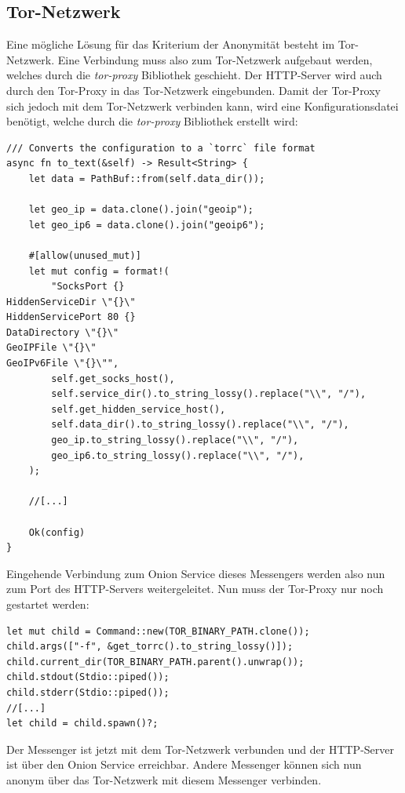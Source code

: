 \documentclass[a4paper,ngerman, headheight=28pt,12pt]{scrartcl}
\begin{document}
\subsection{Tor-Netzwerk}
Eine mögliche Lösung für das Kriterium der Anonymität besteht im Tor-Netzwerk. Eine Verbindung muss also zum Tor-Netzwerk aufgebaut werden, welches durch die \textit{tor-proxy} Bibliothek geschieht.
Der HTTP-Server wird auch durch den Tor-Proxy in das Tor-Netzwerk eingebunden. Damit der Tor-Proxy sich jedoch mit dem Tor-Netzwerk verbinden kann, wird eine Konfigurationsdatei benötigt, welche durch die \textit{tor-proxy} Bibliothek erstellt wird:
\begin{verbatim}
/// Converts the configuration to a `torrc` file format
async fn to_text(&self) -> Result<String> {
    let data = PathBuf::from(self.data_dir());

    let geo_ip = data.clone().join("geoip");
    let geo_ip6 = data.clone().join("geoip6");

    #[allow(unused_mut)]
    let mut config = format!(
        "SocksPort {}
HiddenServiceDir \"{}\"
HiddenServicePort 80 {}
DataDirectory \"{}\"
GeoIPFile \"{}\"
GeoIPv6File \"{}\"",
        self.get_socks_host(),
        self.service_dir().to_string_lossy().replace("\\", "/"),
        self.get_hidden_service_host(),
        self.data_dir().to_string_lossy().replace("\\", "/"),
        geo_ip.to_string_lossy().replace("\\", "/"),
        geo_ip6.to_string_lossy().replace("\\", "/"),
    );

    //[...]

    Ok(config)
}
\end{verbatim}
Eingehende Verbindung zum Onion Service dieses Messengers werden also nun zum Port des HTTP-Servers weitergeleitet. Nun muss der Tor-Proxy nur noch gestartet werden:
\begin{verbatim}
let mut child = Command::new(TOR_BINARY_PATH.clone());
child.args(["-f", &get_torrc().to_string_lossy()]);
child.current_dir(TOR_BINARY_PATH.parent().unwrap());
child.stdout(Stdio::piped());
child.stderr(Stdio::piped());
//[...]
let child = child.spawn()?;
\end{verbatim}

Der Messenger ist jetzt mit dem Tor-Netzwerk verbunden und der HTTP-Server ist über den Onion Service erreichbar. Andere Messenger können sich nun anonym über das Tor-Netzwerk mit diesem Messenger verbinden.
\end{document}

